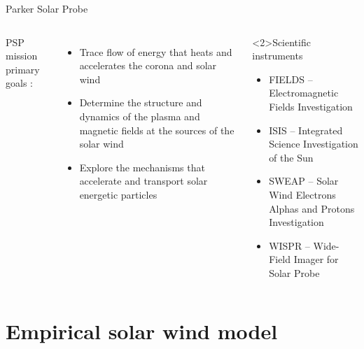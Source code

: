 \begin{frame}[plain,c]{Parker Solar Probe}{}
	\begin{columns}[c]
	\column{\textwidth}
		
		PSP mission primary goals \citep{Fox2015}:
			\begin{itemize}
				\item Trace flow of energy that heats and accelerates the corona and solar wind
				\item Determine the structure and dynamics of the plasma and magnetic fields at the sources of the solar wind
				\item Explore the mechanisms that accelerate and transport solar energetic particles
			\end{itemize}
		\vspace{5mm}
		\begin{block}<2>{Scientific instruments}
			\begin{itemize}
				\item FIELDS -- Electromagnetic Fields Investigation
				\item IS\sun{}IS -- Integrated Science Investigation of the Sun
				\item SWEAP -- Solar Wind Electrons Alphas and Protons Investigation
				\item WISPR -- Wide-Field Imager for Solar Probe
			\end{itemize}
		\end{block}

	\end{columns}
\end{frame}


\section{Empirical solar wind model}

